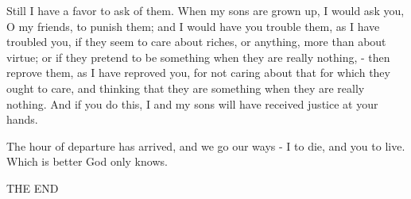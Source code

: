 \documentclass[11pt]{article}
\begin{document}
Still I have a favor to ask of them. When my sons are grown up, I would ask you, O my friends, to punish them; and I would have you trouble them, as I have troubled you, if they seem to care about riches, or anything, more than about virtue; or if they pretend to be something when they are really nothing, - then reprove them, as I have reproved you, for not caring about that for which they ought to care, and thinking that they are something when they are really nothing. And if you do this, I and my sons will have received justice at your hands.

The hour of departure has arrived, and we go our ways - I to die, and you to live. Which is better God only knows.


\begin{center}THE END\end{center}
\end{document}
